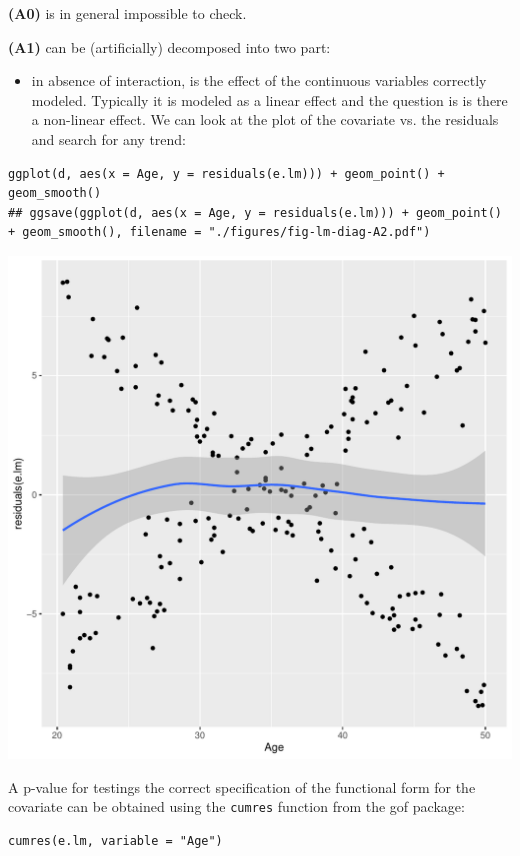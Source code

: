 \documentclass{article}
\begin{document}
\textbf{(A0)} is in general impossible to check.

\bigskip

\noindent \textbf{(A1)} can be (artificially) decomposed into two part:
\begin{itemize}
\item in absence of interaction, is the effect of the continuous variables
correctly modeled. Typically it is modeled as a linear effect and
the question is is there a non-linear effect. We can look at the
plot of the covariate vs. the residuals and search for any trend:
\end{itemize}
\lstset{language=r,label= ,caption= ,captionpos=b,numbers=none}
\begin{lstlisting}
ggplot(d, aes(x = Age, y = residuals(e.lm))) + geom_point() + geom_smooth()
## ggsave(ggplot(d, aes(x = Age, y = residuals(e.lm))) + geom_point() + geom_smooth(), filename = "./figures/fig-lm-diag-A2.pdf")
\end{lstlisting}

\begin{center}
\includegraphics[width=1\textwidth]{./figures/fig-lm-diag-A2.pdf}
\end{center} 

A p-value for testings the correct specification of the functional
form for the covariate can be obtained using the \texttt{cumres} function
from the gof package:
\lstset{language=r,label= ,caption= ,captionpos=b,numbers=none}
\begin{lstlisting}
cumres(e.lm, variable = "Age")
\end{lstlisting}
\end{document}
